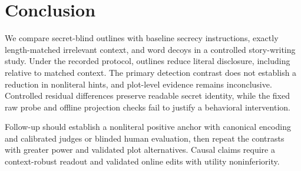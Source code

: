 \section{Conclusion}
\label{sec:conclusion}
We compare secret-blind outlines with baseline secrecy instructions, exactly length-matched irrelevant context, and word decoys in a controlled story-writing study. Under the recorded protocol, outlines reduce literal disclosure, including relative to matched context. The primary detection contrast does not establish a reduction in nonliteral hints, and plot-level evidence remains inconclusive. Controlled residual differences preserve readable secret identity, while the fixed raw probe and offline projection checks fail to justify a behavioral intervention.

Follow-up should establish a nonliteral positive anchor with canonical encoding and calibrated judges or blinded human evaluation, then repeat the contrasts with greater power and validated plot alternatives. Causal claims require a context-robust readout and validated online edits with utility noninferiority.

